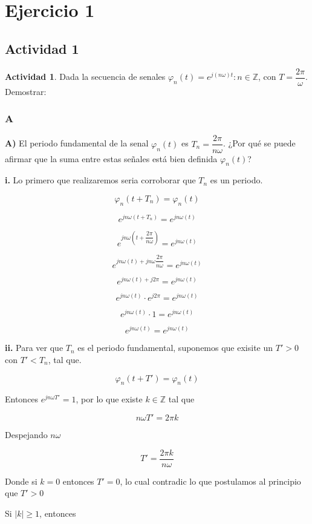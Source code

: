 \chapter{Ejercicio 1}

\section{Actividad 1}

\textbf{Actividad 1}. Dada la secuencia de senales {$\varphi_{n} (t)=e^{j(n\omega)t}: n \in \mathbb{Z}$}, con $T = \dfrac{2\pi}{\omega}$. Demostrar:

\subsection{A}

\textbf{A)} El periodo fundamental de la senal $\varphi_{n}(t)$ es $T_n=\dfrac{2\pi}{n\omega}$. ¿Por qué se puede afirmar que la suma entre estas señales está bien definida $\varphi_{n}(t)$?

\textbf{i.} Lo primero que realizaremos seria corroborar que $T_n$ es un periodo.

$$\varphi_{n}(t+T_n)=\varphi_{n}(t)$$

$$e^{jn\omega(t+T_n)}=e^{jn\omega(t)}$$

$$e^{jn\omega(t+\dfrac{2\pi}{n\omega})}=e^{jn\omega(t)}$$

$$e^{jn\omega(t)+jn\omega\dfrac{2\pi}{n\omega}}=e^{jn\omega(t)}$$

$$e^{jn\omega(t)+j2\pi}=e^{jn\omega(t)}$$

$$e^{jn\omega(t)} \cdot e^{j2\pi} = e^{jn\omega(t)}$$

$$e^{jn\omega(t)} \cdot 1 = e^{jn\omega(t)}$$

$$e^{jn\omega(t)} = e^{jn\omega(t)}$$

\textbf{ii.} Para ver que $T_n$ es el periodo fundamental, suponemos que exisite un $T'>0$ con $T'<T_n$, tal que.

$$\varphi_n(t+T')=\varphi_n(t)$$

Entonces $e^{jn\omega T'} = 1$, por lo que existe $k \in \mathbb{Z}$ tal que

$$n\omega T'= 2\pi k$$

Despejando $n\omega$

$$T'=\dfrac{2\pi k}{n\omega}$$

Donde si $k=0$ entonces $T'=0$, lo cual contradic lo que postulamos al principio que $T'>0$

Si $|k| \ge 1$, entonces

